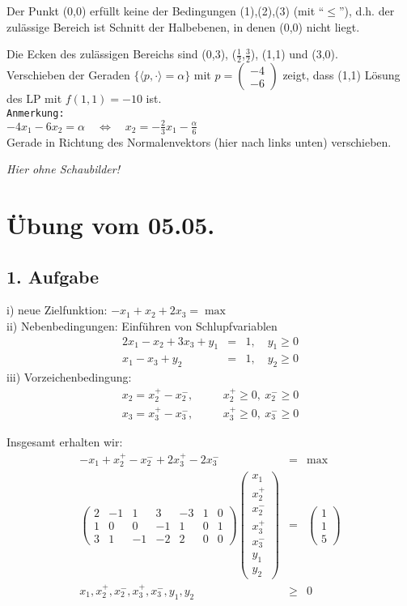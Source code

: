 \documentclass[a4paper,11pt,twoside,titlepage]{article}
\begin{document}
Der Punkt (0,0) erfüllt keine der Bedingungen (1),(2),(3) (mit "`$\leq$"'), d.h. der zulässige Bereich ist Schnitt der Halbebenen, in denen (0,0) nicht liegt.

Die Ecken des zulässigen Bereichs sind (0,3), ($\frac{1}{2}$,$\frac{3}{2}$), (1,1) und (3,0).\\
Verschieben der Geraden $\{\langle p,\cdot\rangle=\alpha\}$ mit $p=
\begin{pmatrix}
	-4\\-6
\end{pmatrix}$
zeigt, dass (1,1) Lösung des LP mit $f(1,1)=-10$ ist.\\[24pt]
\texttt{Anmerkung:}\\
$-4x_1-6x_2=\alpha\quad\Leftrightarrow\quad x_2=-\frac{2}{3}x_1-\frac{\alpha}{6}$\\
Gerade in Richtung des Normalenvektors (hier nach links unten) verschieben.

\textit{Hier ohne Schaubilder!}
\newpage

\section{Übung vom 05.05.}
\subsection*{1. Aufgabe}
i) neue Zielfunktion: $-x_1+x_2+2x_3=\max$\\
ii) Nebenbedingungen: Einführen von Schlupfvariablen
\begin{eqnarray*}
2x_1-x_2+3x_3+y_1&=&1,\quad y_1\geq0\\
x_1-x_3+y_2&=&1,\quad y_2\geq0
\end{eqnarray*}
iii) Vorzeichenbedingung:
\begin{eqnarray*}
x_2=x_2^+-x_2^-,&\quad&x_2^+\geq0,\ x_2^-\geq0\\
x_3=x_3^+-x_3^-,&\quad&x_3^+\geq0,\ x_3^-\geq0
\end{eqnarray*}

Insgesamt erhalten wir:
\begin{eqnarray*}
-x_1+x_2^+-x_2^-+2x_3^+-2x_3^-&=&\max\\
\left(
\begin{array}{ccccccc}
2&-1&1&3&-3&1&0\\
1&0&0&-1&1&0&1\\
3&1&-1&-2&2&0&0	
\end{array}\right)
\left(
\begin{array}{c}
x_1\\x_2^+\\x_2^-\\x_3^+\\x_3^-\\y_1\\y_2
\end{array}\right)
&=&
\left(
\begin{array}{c}
1\\1\\5
\end{array}\right)\\
x_1,x_2^+,x_2^-,x_3^+,x_3^-,y_1,y_2&\geq&0
\end{eqnarray*}
\end{document}
